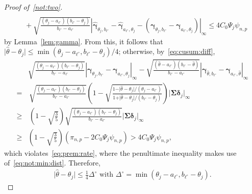 \documentclass[11pt, a4paper]{article}
\renewcommand{\l}{\left}
\renewcommand{\r}{\right}
\def\wh{\widehat}
\newcommand{\cp}{\theta}
\newcommand{\nn}{\nonumber}
\theoremstyle{definition}
\theoremstyle{definition}
\theoremstyle{definition}
\theoremstyle{definition}
\theoremstyle{definition}
\theoremstyle{remark}
\theoremstyle{definition}
\theoremstyle{definition}
\theoremstyle{definition}
\begin{document}
\begin{proof}[Proof of~\ref{not:two}]
\begin{align}
	\nn \\
	& \, +
	\sqrt{\frac{(\cp_j - a_{\ell^\circ}) (b_{\ell^\circ} - \cp_j) }{ b_{\ell^\circ} - a_{\ell^\circ} }} \l\vert \wh{\bm\gamma}_{\cp_j, b_{\ell^\circ}} - \wh{\bm\gamma}_{a_{\ell^\circ}, \cp_j} - \l( \bm\gamma_{\cp_j, b_{\ell^\circ}} - \bm\gamma_{a_{\ell^\circ}, \cp_j} \r) \r\vert_\infty \le 4 C_0 \Psi_j \psi_{n, p}
	\label{eq:prem:rate}
	\end{align}
	by Lemma~\ref{lem:gamma}.
	From this, it follows that $\vert \wh\cp - \cp_j \vert \le \min( \cp_j - a_{\ell^\circ}, b_{\ell^\circ} - \cp_j)/4$; otherwise, by~\eqref{eq:cusum:diff},
	\begin{align}
	& \sqrt{\frac{(\cp_j - a_{\ell^\circ}) (b_{\ell^\circ} - \cp_j) }{ b_{\ell^\circ} - a_{\ell^\circ} }} \l\vert \bm\gamma_{\cp_j, b_{\ell^\circ}} - \bm\gamma_{a_{\ell^\circ}, \cp_j} \r\vert_\infty
	- 
	\sqrt{\frac{(\wh\cp - a_{\ell^\circ}) (b_{\ell^\circ} - \wh\cp) }{ b_{\ell^\circ} - a_{\ell^\circ} }} \l\vert \bm\gamma_{\wh\cp, b_{\ell^\circ}} - \bm\gamma_{a_{\ell^\circ}, \wh\cp} \r\vert_\infty
	\nn \\
	= & \, \sqrt{\frac{(\cp_j - a_{\ell^\circ}) (b_{\ell^\circ} - \cp_j) }{ b_{\ell^\circ} - a_{\ell^\circ} }} \l( 1 - \sqrt{\frac{1 - \vert \wh\cp - \cp_j \vert/(\cp_j - a_{\ell^\circ})}{1 + \vert \wh\cp - \cp_j \vert/(b_{\ell^\circ} - \cp_j)}} \r)  \vert \bm\Sigma \bm\delta_j \vert_\infty 
	\nn \\
	\ge & \, \l( 1 - \sqrt{\frac{3}{5}} \r) \sqrt{\frac{(\cp_j - a_{\ell^\circ}) (b_{\ell^\circ} - \cp_j) }{ b_{\ell^\circ} - a_{\ell^\circ} }} \vert \bm\Sigma \bm\delta_j \vert_\infty\nn\\
	\ge &\l(1 - \sqrt{\frac{3}{5}}\r) (\pi_{n, p} - 2 C_0 \Psi_j \psi_{n, p}) > 4 C_0 \Psi_j \psi_{n, p},
	\label{eq:cusum:deriv}
	\end{align}
	which violates~\eqref{eq:prem:rate}, where the penultimate inequality makes use of~\eqref{eq:not:min:dist}.
	Therefore,
	\begin{align}
	\vert \wh\cp - \cp_j \vert \le \frac{1}{4} \Delta^\circ \text{ \ with \ } \Delta^\circ = \min( \cp_j - a_{\ell^\circ}, b_{\ell^\circ} - \cp_j). 
	\label{eq:one:fourth}
	\end{align}
	

\end{proof}
\end{document}
